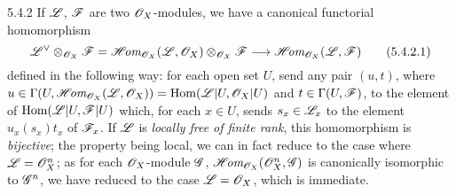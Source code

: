 \begin{env}{5.4.2}
\label{env-0.5.4.2}
If $\mathscr{L}$, $\mathscr{F}$ are two $\mathscr{O}_X$-modules, we have a canonical functorial homomorphism
\[
  {\mathscr{L}}^\vee\otimes_{\mathscr{O}_X}\mathscr{F}=\mathscr{H}\!\textit{om}_{\mathscr{O}_X}(\mathscr{L},\mathscr{O}_X)\otimes_{\mathscr{O}_X}\mathscr{F}
  \longrightarrow\mathscr{H}\!\textit{om}_{\mathscr{O}_X}(\mathscr{L},\mathscr{F})
  \tag{5.4.2.1}
\]
defined in the following way: for each open set $U$, send any pair $(u,t)$, where
$u\in\Gamma(U,\mathscr{H}\!\textit{om}_{\mathscr{O}_X}(\mathscr{L},\mathscr{O}_X))={\mathop{\mathrm{Hom}}\nolimits}(\mathscr{L}|U,\mathscr{O}_X|U)$ and
$t\in\Gamma(U,\mathscr{F})$, to the element of ${\mathop{\mathrm{Hom}}\nolimits}(\mathscr{L}|U,\mathscr{F}|U)$ which, for each $x\in U$,
sends $s_x\in\mathscr{L}_x$ to the element $u_x(s_x)t_x$ of $\mathscr{F}_x$. If $\mathscr{L}$ is
\emph{locally free of finite rank}, this homomorphism is \emph{bijective}; the property being
local, we can in fact reduce to the case where $\mathscr{L}=\mathscr{O}_X^n$; as for each $\mathscr{O}_X$-module
$\mathscr{G}$, $\mathscr{H}\!\textit{om}_{\mathscr{O}_X}(\mathscr{O}_X^n,\mathscr{G})$ is canonically isomorphic to $\mathscr{G}^n$, we have
reduced to the case $\mathscr{L}=\mathscr{O}_X$, which is immediate.
\end{env}

